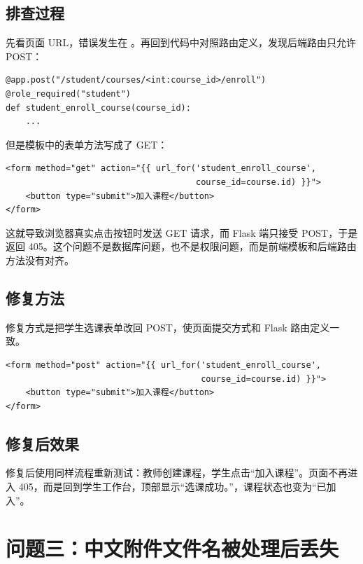 \documentclass[UTF8,12pt]{ctexart}
\begin{document}
\subsection{排查过程}

先看页面 URL，错误发生在 。再回到代码中对照路由定义，发现后端路由只允许 POST：

\begin{verbatim}
@app.post("/student/courses/<int:course_id>/enroll")
@role_required("student")
def student_enroll_course(course_id):
    ...
\end{verbatim}

但是模板中的表单方法写成了 GET：

\begin{verbatim}
<form method="get" action="{{ url_for('student_enroll_course',
                                      course_id=course.id) }}">
    <button type="submit">加入课程</button>
</form>
\end{verbatim}

这就导致浏览器真实点击按钮时发送 GET 请求，而 Flask 端只接受 POST，于是返回 405。这个问题不是数据库问题，也不是权限问题，而是前端模板和后端路由方法没有对齐。

\subsection{修复方法}

修复方式是把学生选课表单改回 POST，使页面提交方式和 Flask 路由定义一致。

\begin{verbatim}
<form method="post" action="{{ url_for('student_enroll_course',
                                       course_id=course.id) }}">
    <button type="submit">加入课程</button>
</form>
\end{verbatim}

\subsection{修复后效果}

修复后使用同样流程重新测试：教师创建课程，学生点击“加入课程”。页面不再进入 405，而是回到学生工作台，顶部显示“选课成功。”，课程状态也变为“已加入”。


\newpage

\section{问题三：中文附件文件名被处理后丢失}
\end{document}

